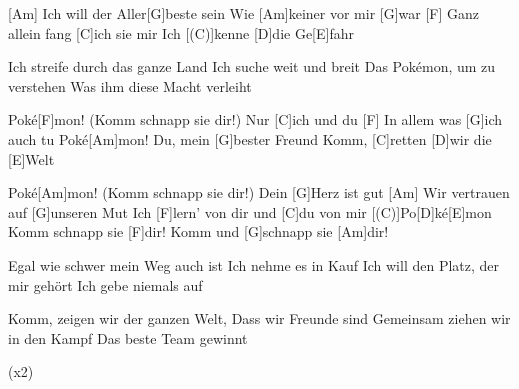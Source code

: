 

\begin{guitar}
	[Am] Ich will der Aller[G]beste sein
	Wie [Am]keiner vor mir [G]war
	[F] Ganz allein fang [C]ich sie mir
	Ich [(C)]kenne [D]die Ge[E]fahr
	
	Ich streife durch das ganze Land
	Ich suche weit und breit
	Das Pokémon, um zu verstehen
	Was ihm diese Macht verleiht
	
	Poké[F]mon! (Komm schnapp sie dir!) Nur [C]ich und du
	[F] In allem was [G]ich auch tu
	Poké[Am]mon! Du, mein [G]bester Freund
	Komm, [C]retten [D]wir die [E]Welt
	
	Poké[Am]mon! (Komm schnapp sie dir!) Dein [G]Herz ist gut
	[Am] Wir vertrauen auf [G]unseren Mut
	Ich [F]lern' von dir und [C]du von mir
	[(C)]Po[D]ké[E]mon
	Komm schnapp sie [F]dir! Komm und [G]schnapp sie [Am]dir!
	
	Egal wie schwer mein Weg auch ist
	Ich nehme es in Kauf
	Ich will den Platz, der mir gehört
	Ich gebe niemals auf
	
	Komm, zeigen wir der ganzen Welt,
	Dass wir Freunde sind
	Gemeinsam ziehen wir in den Kampf
	Das beste Team gewinnt
	
	  (x2)
\end{guitar}